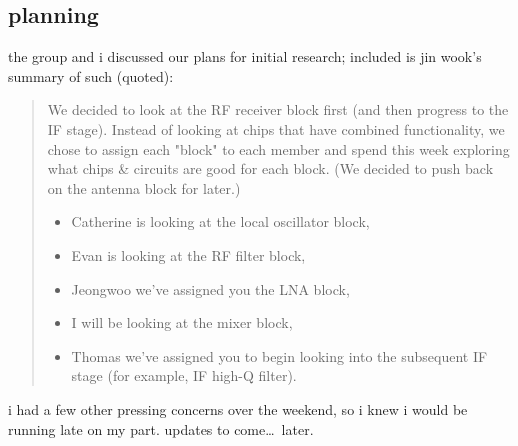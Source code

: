 \subsection*{planning}
the group and i discussed our plans for initial research; included is jin
wook's summary of such (quoted):
\begin{quote}
	We decided to look at the RF receiver block first (and then progress to
	the IF stage). Instead of looking at chips that have combined
	functionality, we chose to assign each "block" to each member and spend
	this week exploring what chips \& circuits are good for each block. (We
	decided to push back on the antenna block for later.)

	\begin{itemize}
		\item Catherine is looking at the local oscillator block,
		\item Evan is looking at the RF filter block,
		\item Jeongwoo we've assigned you the LNA block,
		\item I will be looking at the mixer block,
		\item Thomas we've assigned you to begin looking into the
		subsequent IF stage (for example, IF high-Q filter).
	\end{itemize}
\end{quote}
i had a few other pressing concerns over the weekend, so i knew i would be
running late on my part. updates to come\ldots\ later.
